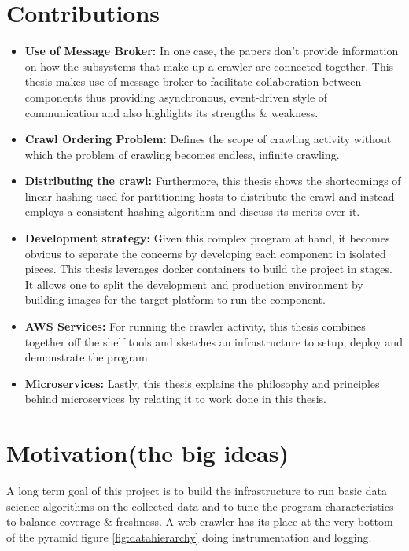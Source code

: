 \section{Contributions}
\begin{itemize}
  \item \textbf{Use of Message Broker:} In one case, the papers \cite{mercator} \cite{multicrawler} \cite{ubicrawler} \cite{irlbot} don't provide information on how the subsystems that make up a crawler are connected together. This thesis makes use of message broker to facilitate collaboration between components thus providing asynchronous, event-driven style of communication and also highlights its strengths \& weakness.
   \item \textbf{Crawl Ordering Problem:} Defines the scope of crawling activity without which the problem of crawling becomes endless, infinite crawling.
   \item \textbf{Distributing the crawl:} Furthermore, this thesis shows the shortcomings of linear hashing used for partitioning hosts to distribute the crawl and instead employs a consistent hashing\cite{consisthash} algorithm and discuss its merits over it.
    \item \textbf{Development strategy:}  Given this complex program at hand, it becomes obvious to separate the concerns by developing each component in isolated pieces. This thesis leverages docker containers to build the project in stages. It allows one to split the development and production environment by building images for the target platform to run the component.
    \item \textbf{AWS Services:} For running the crawler activity, this thesis combines together off the shelf tools and sketches an infrastructure to setup, deploy and demonstrate the program.
    \item \textbf{Microservices:} Lastly, this thesis explains the philosophy and principles behind microservices \cite{microservices} by relating it to work done in this thesis.
\end{itemize}

\pagebreak

\section{Motivation(the big ideas)}
A long term goal of this project is to build the infrastructure to run basic data science algorithms on the collected data and to tune the program characteristics to balance coverage \& freshness. A web crawler has its place at the very bottom of the pyramid figure \ref{fig:datahierarchy} doing instrumentation and logging.


